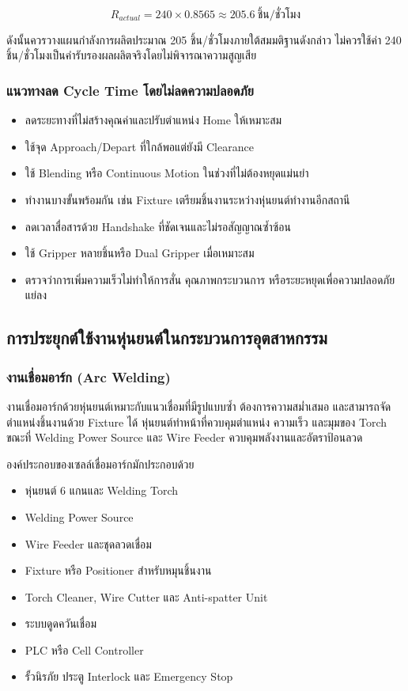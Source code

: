 \[
R_{actual}=240\times0.8565\approx205.6\ \text{ชิ้น/ชั่วโมง}
\]

ดังนั้นควรวางแผนกำลังการผลิตประมาณ 205 ชิ้น/ชั่วโมงภายใต้สมมติฐานดังกล่าว ไม่ควรใช้ค่า 240 ชิ้น/ชั่วโมงเป็นคำรับรองผลผลิตจริงโดยไม่พิจารณาความสูญเสีย

\subsubsection{แนวทางลด Cycle Time โดยไม่ลดความปลอดภัย}

\begin{itemize}
    \item ลดระยะทางที่ไม่สร้างคุณค่าและปรับตำแหน่ง Home ให้เหมาะสม
    \item ใช้จุด Approach/Depart ที่ใกล้พอแต่ยังมี Clearance
    \item ใช้ Blending หรือ Continuous Motion ในช่วงที่ไม่ต้องหยุดแม่นยำ
    \item ทำงานบางขั้นพร้อมกัน เช่น Fixture เตรียมชิ้นงานระหว่างหุ่นยนต์ทำงานอีกสถานี
    \item ลดเวลาสื่อสารด้วย Handshake ที่ชัดเจนและไม่รอสัญญาณซ้ำซ้อน
    \item ใช้ Gripper หลายชิ้นหรือ Dual Gripper เมื่อเหมาะสม
    \item ตรวจว่าการเพิ่มความเร็วไม่ทำให้การสั่น คุณภาพกระบวนการ หรือระยะหยุดเพื่อความปลอดภัยแย่ลง
\end{itemize}


\subsection{การประยุกต์ใช้งานหุ่นยนต์ในกระบวนการอุตสาหกรรม}

\subsubsection{งานเชื่อมอาร์ก (Arc Welding)}

งานเชื่อมอาร์กด้วยหุ่นยนต์เหมาะกับแนวเชื่อมที่มีรูปแบบซ้ำ ต้องการความสม่ำเสมอ และสามารถจัดตำแหน่งชิ้นงานด้วย Fixture ได้ หุ่นยนต์ทำหน้าที่ควบคุมตำแหน่ง ความเร็ว และมุมของ Torch ขณะที่ Welding Power Source และ Wire Feeder ควบคุมพลังงานและอัตราป้อนลวด

องค์ประกอบของเซลล์เชื่อมอาร์กมักประกอบด้วย

\begin{itemize}
    \item หุ่นยนต์ 6 แกนและ Welding Torch
    \item Welding Power Source
    \item Wire Feeder และชุดลวดเชื่อม
    \item Fixture หรือ Positioner สำหรับหมุนชิ้นงาน
    \item Torch Cleaner, Wire Cutter และ Anti-spatter Unit
    \item ระบบดูดควันเชื่อม
    \item PLC หรือ Cell Controller
    \item รั้วนิรภัย ประตู Interlock และ Emergency Stop
\end{itemize}

